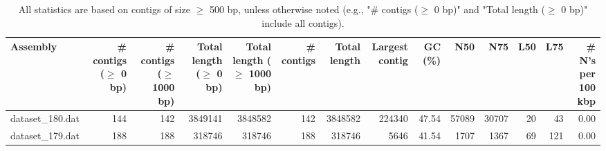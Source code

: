 \documentclass[12pt,a4paper]{article}
\begin{document}
\begin{table}[ht]
\begin{center}
\caption{All statistics are based on contigs of size $\geq$ 500 bp, unless otherwise noted (e.g., "\# contigs ($\geq$ 0 bp)" and "Total length ($\geq$ 0 bp)" include all contigs).}
\begin{tabular}{|l*{13}{|r}|}
\hline
Assembly & \# contigs ($\geq$ 0 bp) & \# contigs ($\geq$ 1000 bp) & Total length ($\geq$ 0 bp) & Total length ($\geq$ 1000 bp) & \# contigs & Total length & Largest contig & GC (\%) & N50 & N75 & L50 & L75 & \# N's per 100 kbp \\ \hline
dataset\_180.dat & 144 & 142 & 3849141 & 3848582 & 142 & 3848582 & 224340 & 47.54 & 57089 & 30707 & 20 & 43 & 0.00 \\ \hline
dataset\_179.dat & 188 & 188 & 318746 & 318746 & 188 & 318746 & 5646 & 41.54 & 1707 & 1367 & 69 & 121 & 0.00 \\ \hline
\end{tabular}
\end{center}
\end{table}
\end{document}
